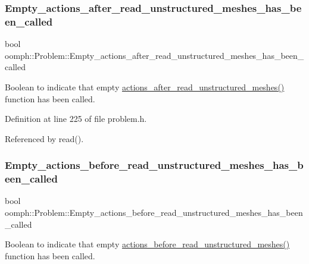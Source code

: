 \subsubsection{\texorpdfstring{Empty\+\_\+actions\+\_\+after\+\_\+read\+\_\+unstructured\+\_\+meshes\+\_\+has\+\_\+been\+\_\+called}{Empty\_actions\_after\_read\_unstructured\_meshes\_has\_been\_called}}
{\footnotesize\ttfamily bool oomph\+::\+Problem\+::\+Empty\+\_\+actions\+\_\+after\+\_\+read\+\_\+unstructured\+\_\+meshes\+\_\+has\+\_\+been\+\_\+called\hspace{0.3cm}{\ttfamily [private]}}



Boolean to indicate that empty \hyperlink{classoomph_1_1Problem_a498317b3e390eddf2169ab989ee8d6b4}{actions\+\_\+after\+\_\+read\+\_\+unstructured\+\_\+meshes()} function has been called. 



Definition at line 225 of file problem.\+h.



Referenced by read().

\mbox{\label{classoomph_1_1Problem_a5f13ea67c29022392857b5c19bb3af71}} 
\subsubsection{\texorpdfstring{Empty\+\_\+actions\+\_\+before\+\_\+read\+\_\+unstructured\+\_\+meshes\+\_\+has\+\_\+been\+\_\+called}{Empty\_actions\_before\_read\_unstructured\_meshes\_has\_been\_called}}
{\footnotesize\ttfamily bool oomph\+::\+Problem\+::\+Empty\+\_\+actions\+\_\+before\+\_\+read\+\_\+unstructured\+\_\+meshes\+\_\+has\+\_\+been\+\_\+called\hspace{0.3cm}{\ttfamily [private]}}



Boolean to indicate that empty \hyperlink{classoomph_1_1Problem_af10662119a7a0c3a47879fa0d0644452}{actions\+\_\+before\+\_\+read\+\_\+unstructured\+\_\+meshes()} function has been called. 




